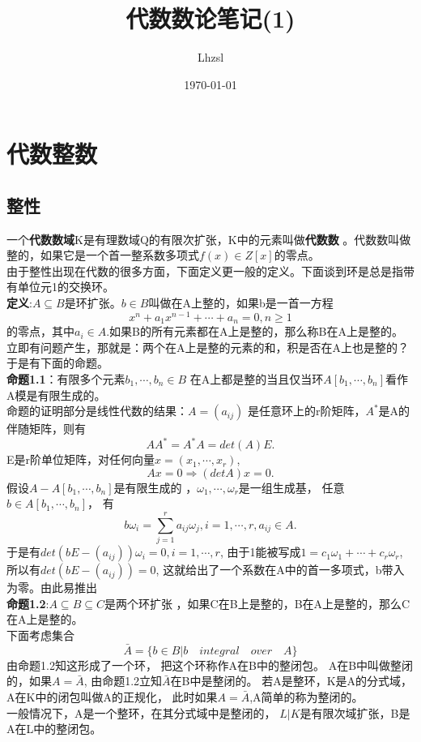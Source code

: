 \documentclass[UTF8]{article}
\title{代数数论笔记(1)}
\author{Lhzsl}
\date{\today }
\begin{document}
	\maketitle
	\tableofcontents
\section{代数整数}
	\subsection{整性}
	一个\textbf{代数数域}K是有理数域Q的有限次扩张，K中的元素叫做\textbf{代数数} 。代数数叫做整的，如果它是一个首一整系数多项式$f(x)\in Z[x]$的零点。\\
	由于整性出现在代数的很多方面，下面定义更一般的定义。下面谈到环是总是指带有单位元1的交换环。\\
	\textbf{定义}:$A\subseteq B$是环扩张。$b \in B$叫做在A上整的，如果b是一首一方程$$x^n+a_1 x^{n-1}+\cdots +a_n=0,n \geq 1$$
	的零点，其中$a_i \in A$.如果B的所有元素都在A上是整的，那么称B在A上是整的。\\
	立即有问题产生，那就是：两个在A上是整的元素的和，积是否在A上也是整的？于是有下面的命题。\\
	\textbf{命题1.1}：有限多个元素$b_1,\cdots,b_n \in B$
	在A上都是整的当且仅当环$A[b_1,\cdots,b_n]$看作A模是有限生成的。\\
	命题的证明部分是线性代数的结果：$A=(a_{ij})$
	是任意环上的r阶矩阵，$A^{*}$是A的伴随矩阵，则有$$AA^*=A^*A=det(A)E.$$
	E是r阶单位矩阵，对任何向量$x=(x_1,\cdots ,x_r)$,$$Ax=0\Rightarrow (detA)x=0.$$
	假设$A-A[b_1,\cdots,b_n]$是有限生成的
	，$\omega_1,\cdots,\omega_r$是一组生成基，
	任意$b \in A[b_1,\cdots,b_n]$，
	有$$b\omega_i=\sum_{j=1}^ra_{ij}\omega_j,i=1,\cdots,r,a_{ij}\in A.$$
	于是有$det(bE-(a_{ij}))\omega_i=0,i=1,\cdots,r$,
	由于1能被写成$1=c_1\omega_1+\cdots+c_r\omega_r$,
	所以有$det(bE-(a_{ij}))=0$,
	这就给出了一个系数在A中的首一多项式，b带入为零。由此易推出\\
	\textbf{命题1.2}:$A \subseteq B \subseteq C$是两个环扩张
	，如果C在B上是整的，B在A上是整的，那么C在A上是整的。\\
	下面考虑集合$$\bar{A}=\{b \in B|b\quad integral\quad over\quad A\}$$由命题1.2知这形成了一个环，
	把这个环称作A在B中的整闭包。
	A在B中叫做整闭的，如果$A=\bar{A}$,
	由命题1.2立知$\bar{A}$在B中是整闭的。
	若A是整环，K是A的分式域，A在K中的闭包叫做A的正规化，
	此时如果$A=\bar{A}$,A简单的称为整闭的。\\
	一般情况下，A是一个整环，在其分式域中是整闭的，
	$L|K$是有限次域扩张，B是A在L中的整闭包。
\end{document}
